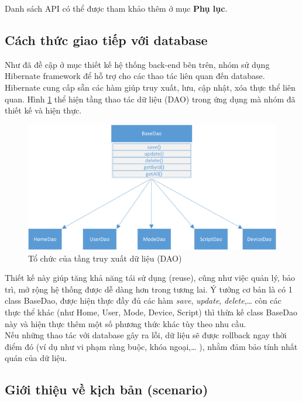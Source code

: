 \documentclass[12pt,a4paper,oneside]{extbook}
\begin{document}
\noindent
Danh sách API có thể được tham khảo thêm ở mục \textbf{Phụ lục}.

\subsection{Cách thức giao tiếp với database}
Như đã đề cập ở mục thiết kế hệ thống back-end bên trên, nhóm sử dụng Hibernate framework để hỗ trợ cho các thao tác liên quan đến database. Hibernate cung cấp sẵn các hàm giúp truy xuất, lưu, cập nhật, xóa thực thể liên quan. Hình \ref{fig:6-DAO-structure} thể hiện tầng thao tác dữ liệu (DAO) trong ứng dụng mà nhóm đã thiết kế và hiện thực.

\begin{figure}[h]
  \centering
    \includegraphics[width=12cm]{6-DAO-structure}
  \caption{ Tổ chức của tầng truy xuất dữ liệu (DAO)}\label{fig:6-DAO-structure}
\end{figure}

\noindent
Thiết kế này giúp tăng khả năng tái sử dụng (reuse), cũng như việc quản lý, bảo trì, mở rộng hệ thống được dễ dàng hơn trong tương lai. Ý tưởng cơ bản là có 1 class BaseDao, được hiện thực đầy đủ các hàm \textit{save}, \textit{update}, \textit{delete},\dots\hspace{0mm} còn các thực thể khác (như Home, User, Mode, Device, Script) thì thừa kế class BaseDao này và hiện thực thêm một số phương thức khác tùy theo nhu cầu.\\

\noindent
Nếu những thao tác với database gây ra lỗi, dữ liệu sẽ được rollback ngay thời điểm đó (ví dụ như vi phạm ràng buộc, khóa ngoại,\dots\hspace{0mm} ), nhằm đảm bảo tính nhất quán của dữ liệu.

\subsection{Giới thiệu về kịch bản (scenario)}
\end{document}
